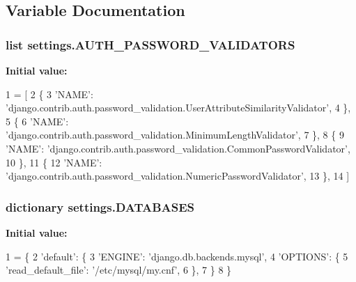 \subsection{Variable Documentation}
\hypertarget{namespacesettings_a142a145966725a9e50377b55c4e012ed}{
\subsubsection[{A\-U\-T\-H\-\_\-\-P\-A\-S\-S\-W\-O\-R\-D\-\_\-\-V\-A\-L\-I\-D\-A\-T\-O\-R\-S}]{\setlength{\rightskip}{0pt plus 5cm}list settings.\-A\-U\-T\-H\-\_\-\-P\-A\-S\-S\-W\-O\-R\-D\-\_\-\-V\-A\-L\-I\-D\-A\-T\-O\-R\-S}}\label{namespacesettings_a142a145966725a9e50377b55c4e012ed}
{\bfseries Initial value\-:}
\begin{DoxyCode}
1 = [
2     \{
3         \textcolor{stringliteral}{'NAME'}: \textcolor{stringliteral}{'django.contrib.auth.password\_validation.UserAttributeSimilarityValidator'},
4     \},
5     \{
6         \textcolor{stringliteral}{'NAME'}: \textcolor{stringliteral}{'django.contrib.auth.password\_validation.MinimumLengthValidator'},
7     \},
8     \{
9         \textcolor{stringliteral}{'NAME'}: \textcolor{stringliteral}{'django.contrib.auth.password\_validation.CommonPasswordValidator'},
10     \},
11     \{
12         \textcolor{stringliteral}{'NAME'}: \textcolor{stringliteral}{'django.contrib.auth.password\_validation.NumericPasswordValidator'},
13     \},
14 ]
\end{DoxyCode}
\hypertarget{namespacesettings_a65f134b0e21f6de64f826c5f10c6ddb1}{
\subsubsection[{D\-A\-T\-A\-B\-A\-S\-E\-S}]{\setlength{\rightskip}{0pt plus 5cm}dictionary settings.\-D\-A\-T\-A\-B\-A\-S\-E\-S}}\label{namespacesettings_a65f134b0e21f6de64f826c5f10c6ddb1}
{\bfseries Initial value\-:}
\begin{DoxyCode}
1 = \{
2     \textcolor{stringliteral}{'default'}: \{
3         \textcolor{stringliteral}{'ENGINE'}: \textcolor{stringliteral}{'django.db.backends.mysql'},
4         \textcolor{stringliteral}{'OPTIONS'}: \{
5             \textcolor{stringliteral}{'read\_default\_file'}: \textcolor{stringliteral}{'/etc/mysql/my.cnf'},
6         \},
7     \}
8 \}
\end{DoxyCode}
